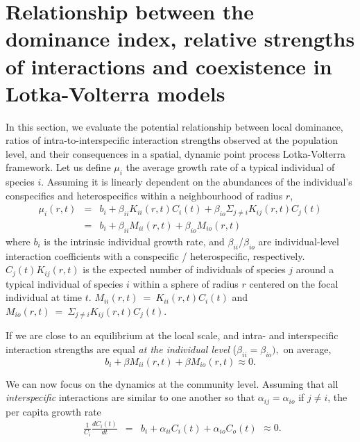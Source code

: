 \documentclass[english]{article}
\begin{document}
\section{Relationship between the dominance index, relative strengths of interactions
and coexistence in Lotka-Volterra models}

In this section, we evaluate the potential relationship between local
dominance, ratios of intra-to-interspecific interaction strengths
observed at the population level, and their consequences in a spatial,
dynamic point process Lotka-Volterra framework. Let us define $\mu_{i}$
the average growth rate of a typical individual of species $i$. Assuming
it is linearly dependent on the abundances of the individual's conspecifics
and heterospecifics within a neighbourhood of radius $r$,
\begin{equation}
\begin{array}{ccc}
\mu_{i}(r,t) & = & b_{i}+\beta_{ii}K_{ii}(r,t)C_{i}(t)+\beta_{io}\Sigma_{j\neq i}K_{ij}(r,t)C_{j}(t)\\
 & = & b_{i}+\beta_{ii}M_{ii}(r,t)+\beta_{io}M_{io}(r,t)
\end{array}\label{eq:lv_individual}
\end{equation}
where $b_{i}$ is the intrinsic individual growth rate, and $\beta_{ii}$/$\beta_{io}$
are individual-level interaction coefficients with a conspecific /
heterospecific, respectively. $C_{j}(t)K_{ij}(r,t)$ is the expected
number of individuals of species $j$ around a typical individual
of species $i$ within a sphere of radius $r$ centered on the focal
individual at time $t$. $M_{ii}(r,t)~=~K_{ii}(r,t)C_{i}(t)$ and $M_{io}(r,t)~=~\Sigma_{j\neq i}K_{ij}(r,t)C_{j}(t)$.

If we are close to an equilibrium at the local scale, and intra- and
interspecific interaction strengths are equal \textit{at the individual
level} ($\beta_{ii}=\beta_{io}),$ on average,
\begin{equation}
b_{i}+\beta M_{ii}(r,t)+\beta M_{io}(r,t)\approx0.\label{eq:lv_individual_equilibrium}
\end{equation}

\medskip{}

We can now focus on the dynamics at the community level. Assuming
that all \emph{interspecific} interactions are similar to one another
so that $\alpha_{ij}=\alpha_{io}$ if $j\neq i$, the per capita growth
rate
\begin{equation}
\begin{array}{ccc}
\frac{1}{C_{i}}\frac{dC_{i}(t)}{dt} & = & b_{i}+\alpha_{ii}C_{i}(t)+\alpha_{io}C_{o}(t)\end{array}\approx0.\label{eq:lv_population}
\end{equation}
\end{document}
